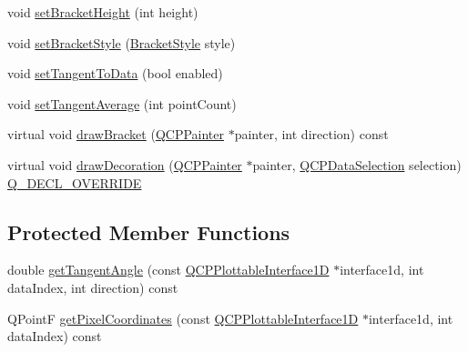 \begin{DoxyCompactItemize}
void \hyperlink{class_q_c_p_selection_decorator_bracket_aed773ad737201cca40efc6fe451acad8}{set\+Bracket\+Height} (int height)
\item 
void \hyperlink{class_q_c_p_selection_decorator_bracket_a04507697438f6ad8cc2aeea5422dcbe5}{set\+Bracket\+Style} (\hyperlink{class_q_c_p_selection_decorator_bracket_aa6d18517ec0553575bbef0de4252336e}{Bracket\+Style} style)
\item 
void \hyperlink{class_q_c_p_selection_decorator_bracket_a93bc6086e53a5e40a08641a7b2e2cdd5}{set\+Tangent\+To\+Data} (bool enabled)
\item 
void \hyperlink{class_q_c_p_selection_decorator_bracket_adb2d0876f25a77c88042b70818f1d6e4}{set\+Tangent\+Average} (int point\+Count)
\item 
virtual void \hyperlink{class_q_c_p_selection_decorator_bracket_a57b65b5508d5bd0f27c9318f3d4646be}{draw\+Bracket} (\hyperlink{class_q_c_p_painter}{Q\+C\+P\+Painter} $\ast$painter, int direction) const
\item 
virtual void \hyperlink{class_q_c_p_selection_decorator_bracket_a9ebe2e729b5012c0a995d788f87fac22}{draw\+Decoration} (\hyperlink{class_q_c_p_painter}{Q\+C\+P\+Painter} $\ast$painter, \hyperlink{class_q_c_p_data_selection}{Q\+C\+P\+Data\+Selection} selection) \hyperlink{qcustomplot_8h_a42cc5eaeb25b85f8b52d2a4b94c56f55}{Q\+\_\+\+D\+E\+C\+L\+\_\+\+O\+V\+E\+R\+R\+I\+DE}
\end{DoxyCompactItemize}
\subsection*{Protected Member Functions}
\begin{DoxyCompactItemize}
\item 
double \hyperlink{class_q_c_p_selection_decorator_bracket_ac002e20586950bf5c91a399863769c61}{get\+Tangent\+Angle} (const \hyperlink{class_q_c_p_plottable_interface1_d}{Q\+C\+P\+Plottable\+Interface1D} $\ast$interface1d, int data\+Index, int direction) const
\item 
Q\+PointF \hyperlink{class_q_c_p_selection_decorator_bracket_a9925ed667e8a645fcb9949bd02ee4a19}{get\+Pixel\+Coordinates} (const \hyperlink{class_q_c_p_plottable_interface1_d}{Q\+C\+P\+Plottable\+Interface1D} $\ast$interface1d, int data\+Index) const
\end{DoxyCompactItemize}
